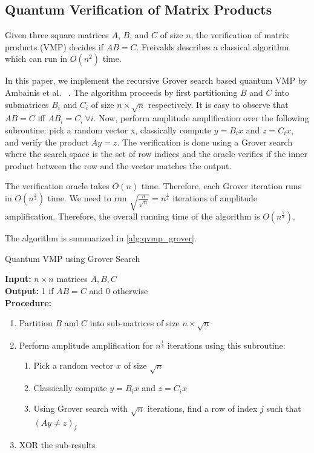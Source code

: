 \documentclass[11pt]{article}
\theoremstyle{definition}
\theoremstyle{remark}
\begin{document}
\subsection{Quantum Verification of Matrix Products}

Given three square matrices $A$, $B$, and $C$ of size $n$, the verification of
matrix products (VMP) decides if $AB = C$. Freivalds describes a classical
algorithm which can run in $O(n^2)$ time.

In this paper, we implement the recursive Grover search based quantum VMP by
Ambainis et al. ~\cite{ambainis2002quantummatrix}. The algorithm proceeds by first
partitioning $B$ and $C$ into submatrices $B_i$ and $C_i$ of size $n \times
\sqrt{n}$ respectively. It is easy to observe that $AB = C$ iff $AB_i = C_i \
\forall i$. Now, perform amplitude amplification over the following subroutine:
pick a random vector x, classically compute $y = B_ix$ and $z = C_ix$, and
verify the product $Ay = z$. The verification is done using a Grover search
where the search space is the set of row indices and the oracle verifies if the
inner product between the row and the vector matches the output.

The verification oracle takes $O(n)$ time. Therefore, each Grover iteration
runs in $O(n^{\frac{3}{2}})$ time. We need to run $\sqrt{\frac{n}{\sqrt{n}}} =
n^{\frac{1}{4}}$ iterations of amplitude amplification. Therefore, the overall
running time of the algorithm is $O(n^{\frac{7}{4}})$.

The algorithm is summarized in \cref{alg:qvmp_grover}.

\begin{algorithm}
  \caption{Quantum VMP using Grover Search ~\cite{lanl2018quantum}}
  \label{alg:qvmp_grover}
  \textbf{Input: } $n \times n$ matrices $A, B, C$ \\
  \textbf{Output: } 1 if $AB = C$ and 0 otherwise \\
  \textbf{Procedure: }
  \begin{enumerate}
    \item Partition $B$ and $C$ into sub-matrices of size $n \times \sqrt{n}$
    \item 
      {
        Perform amplitude amplification for $n^{\frac{1}{4}}$ iterations using this subroutine:
        \begin{enumerate}
          \item Pick a random vector $x$ of size $\sqrt{n}$
          \item Classically compute $y = B_ix$ and $z = C_ix$
          \item Using Grover search with $\sqrt{n}$ iterations, find a row of
            index $j$ such that $(Ay \neq z)_j$
        \end{enumerate}
      }
    \item XOR the sub-results
  \end{enumerate}
\end{algorithm}
\end{document}
